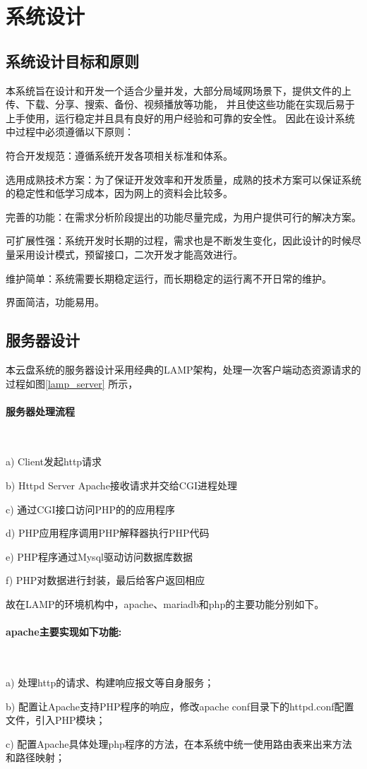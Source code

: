 \section{系统设计}
\subsection{系统设计目标和原则}
本系统旨在设计和开发一个适合少量并发，大部分局域网场景下，提供文件的上传、下载、分享、搜索、备份、视频播放等功能，
并且使这些功能在实现后易于上手使用，运行稳定并且具有良好的用户经验和可靠的安全性。 因此在设计系统中过程中必须遵循以下原则：
\par 符合开发规范：遵循系统开发各项相关标准和体系。
\par 选用成熟技术方案：为了保证开发效率和开发质量，成熟的技术方案可以保证系统的稳定性和低学习成本，因为网上的资料会比较多。
\par 完善的功能：在需求分析阶段提出的功能尽量完成，为用户提供可行的解决方案。
\par 可扩展性强：系统开发时长期的过程，需求也是不断发生变化，因此设计的时候尽量采用设计模式，预留接口，二次开发才能高效进行。
\par 维护简单：系统需要长期稳定运行，而长期稳定的运行离不开日常的维护。
\par 界面简洁，功能易用。

\subsection{服务器设计}
本云盘系统的服务器设计采用经典的LAMP架构，处理一次客户端动态资源请求的过程如图\ref{lamp_server}
所示，
\paragraph{服务器处理流程} $\mathbb{}$ $\mathbb{}$
\par a) Client发起http请求
\par b) Httpd Server Apache接收请求并交给CGI进程处理
\par c) 通过CGI接口访问PHP的的应用程序
\par d) PHP应用程序调用PHP解释器执行PHP代码
\par e) PHP程序通过Mysql驱动访问数据库数据
\par f) PHP对数据进行封装，最后给客户返回相应
\par 故在LAMP的环境机构中，apache、mariadb和php的主要功能分别如下。

\paragraph{apache主要实现如下功能:} $\mathbb{}$ $\mathbb{}$
\par a) 处理http的请求、构建响应报文等自身服务；
\par b) 配置让Apache支持PHP程序的响应，修改apache conf目录下的httpd.conf配置文件，引入PHP模块；
\par c) 配置Apache具体处理php程序的方法，在本系统中统一使用路由表来出来方法和路径映射；
